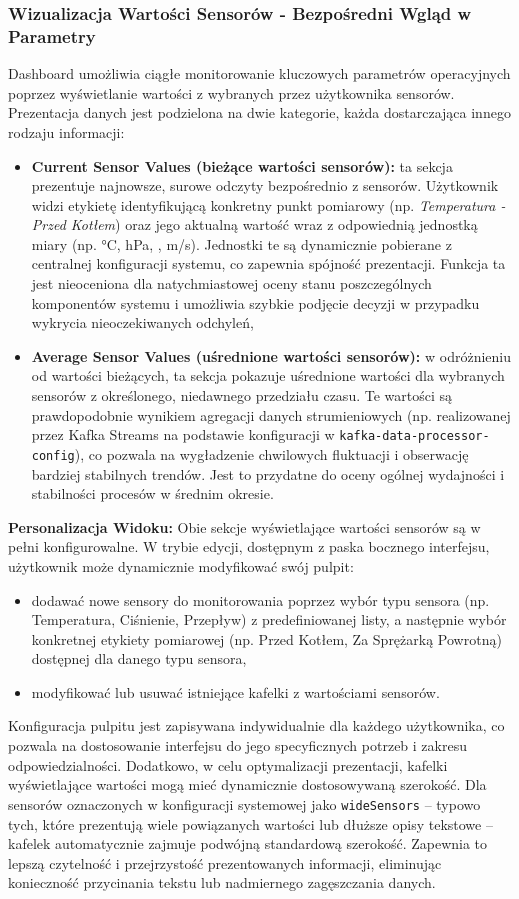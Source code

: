 \subsubsection{Wizualizacja Wartości Sensorów - Bezpośredni Wgląd w Parametry}
Dashboard umożliwia ciągłe monitorowanie kluczowych parametrów operacyjnych poprzez wyświetlanie wartości z wybranych przez użytkownika sensorów. Prezentacja danych jest podzielona na dwie kategorie, każda dostarczająca innego rodzaju informacji:
\begin{itemize}
    \item \textbf{Current Sensor Values (bieżące wartości sensorów):} ta sekcja prezentuje najnowsze, surowe odczyty bezpośrednio z sensorów. Użytkownik widzi etykietę identyfikującą konkretny punkt pomiarowy (np. \textit{Temperatura - Przed Kotłem}) oraz jego aktualną wartość wraz z odpowiednią jednostką miary (np. °C, hPa, \percent, m/s). Jednostki te są dynamicznie pobierane z centralnej konfiguracji systemu, co zapewnia spójność prezentacji. Funkcja ta jest nieoceniona dla natychmiastowej oceny stanu poszczególnych komponentów systemu i umożliwia szybkie podjęcie decyzji w przypadku wykrycia nieoczekiwanych odchyleń,
    \item \textbf{Average Sensor Values (uśrednione wartości sensorów):} w odróżnieniu od wartości bieżących, ta sekcja pokazuje uśrednione wartości dla wybranych sensorów z określonego, niedawnego przedziału czasu. Te wartości są prawdopodobnie wynikiem agregacji danych strumieniowych (np. realizowanej przez Kafka Streams na podstawie konfiguracji w \texttt{kafka-data-processor-config}), co pozwala na wygładzenie chwilowych fluktuacji i obserwację bardziej stabilnych trendów. Jest to przydatne do oceny ogólnej wydajności i stabilności procesów w średnim okresie.
\end{itemize}
\textbf{Personalizacja Widoku:} Obie sekcje wyświetlające wartości sensorów są w pełni konfigurowalne. W trybie edycji, dostępnym z paska bocznego interfejsu, użytkownik może dynamicznie modyfikować swój pulpit:
\begin{itemize}
    \item dodawać nowe sensory do monitorowania poprzez wybór typu sensora (np. Temperatura, Ciśnienie, Przepływ) z predefiniowanej listy, a następnie wybór konkretnej etykiety pomiarowej (np. Przed Kotłem, Za Sprężarką Powrotną) dostępnej dla danego typu sensora,
    \item modyfikować lub usuwać istniejące kafelki z wartościami sensorów.
\end{itemize}
Konfiguracja pulpitu jest zapisywana indywidualnie dla każdego użytkownika, co pozwala na dostosowanie interfejsu do jego specyficznych potrzeb i zakresu odpowiedzialności. Dodatkowo, w celu optymalizacji prezentacji, kafelki wyświetlające wartości mogą mieć dynamicznie dostosowywaną szerokość. Dla sensorów oznaczonych w konfiguracji systemowej jako \texttt{wideSensors} – typowo tych, które prezentują wiele powiązanych wartości lub dłuższe opisy tekstowe – kafelek automatycznie zajmuje podwójną standardową szerokość. Zapewnia to lepszą czytelność i przejrzystość prezentowanych informacji, eliminując konieczność przycinania tekstu lub nadmiernego zagęszczania danych.

